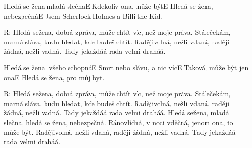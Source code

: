 \resetVars
{}
\MakeHeader
\Lyrics

Hledá se žena,mladá slečnaE
Kdekoliv ona, může býtE
Hledá se žena, nebezpečnáE
Jsem Scherlock Holmes a Billi the Kid.

R: Hledá sežena, dobrá zpráva, může chtít víc, než moje práva.
Stálečekám, marná sláva, budu hledat, kde budeš chtít.
Radějivolná, nežli vdaná, raději žádná, nežli vadná.
Tady jekaždáá rada velmi draháá.

Hledá se žena, všeho schopnáE
Smrt nebo slávu, a nic vícE
Taková, může být jen onaE
Hledá se žena, pro můj byt.

R: Hledá sežena, dobrá zpráva, může chtít víc, než moje práva.
Stálečekám, marná sláva, budu hledat, kde budeš chtít.
Radějivolná, nežli vdaná, raději žádná, nežli vadná.
Tady jekaždáá rada velmi draháá.
Hledá sežena, mladá slečna, hledá se žena, nebezpečná.
Ránovlídná, v noci vděčná, jenom ona, to může být.
Radějivolná, nežli vdaná, raději žádná, nežli vadná.
Tady jekaždáá rada velmi draháá.

\Next
